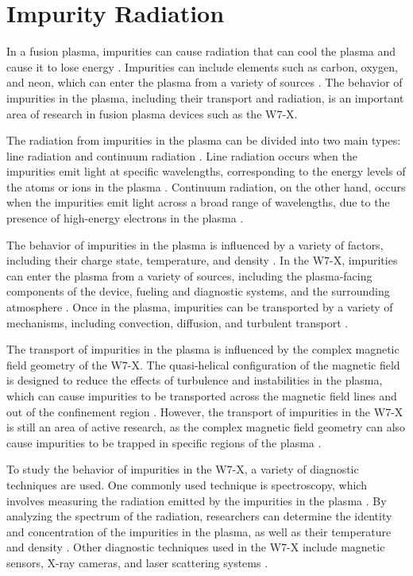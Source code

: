 \documentclass[12pt]{article}
\begin{document}
\section{Impurity Radiation}

In a fusion plasma, impurities can cause radiation that can cool the plasma and cause it to lose energy \cite{hutchinson}. Impurities can include elements such as carbon, oxygen, and neon, which can enter the plasma from a variety of sources \cite{militello}. The behavior of impurities in the plasma, including their transport and radiation, is an important area of research in fusion plasma devices such as the W7-X.

The radiation from impurities in the plasma can be divided into two main types: line radiation and continuum radiation \cite{hutchinson}. Line radiation occurs when the impurities emit light at specific wavelengths, corresponding to the energy levels of the atoms or ions in the plasma \cite{militello}. Continuum radiation, on the other hand, occurs when the impurities emit light across a broad range of wavelengths, due to the presence of high-energy electrons in the plasma \cite{militello}.

The behavior of impurities in the plasma is influenced by a variety of factors, including their charge state, temperature, and density \cite{hutchinson}. In the W7-X, impurities can enter the plasma from a variety of sources, including the plasma-facing components of the device, fueling and diagnostic systems, and the surrounding atmosphere \cite{militello}. Once in the plasma, impurities can be transported by a variety of mechanisms, including convection, diffusion, and turbulent transport \cite{hutchinson}.

The transport of impurities in the plasma is influenced by the complex magnetic field geometry of the W7-X. The quasi-helical configuration of the magnetic field is designed to reduce the effects of turbulence and instabilities in the plasma, which can cause impurities to be transported across the magnetic field lines and out of the confinement region \cite{militello}. However, the transport of impurities in the W7-X is still an area of active research, as the complex magnetic field geometry can also cause impurities to be trapped in specific regions of the plasma \cite{w7x-website}.

To study the behavior of impurities in the W7-X, a variety of diagnostic techniques are used. One commonly used technique is spectroscopy, which involves measuring the radiation emitted by the impurities in the plasma \cite{militello}. By analyzing the spectrum of the radiation, researchers can determine the identity and concentration of the impurities in the plasma, as well as their temperature and density \cite{hutchinson}. Other diagnostic techniques used in the W7-X include magnetic sensors, X-ray cameras, and laser scattering systems \cite{w7x-website}.
\end{document}

